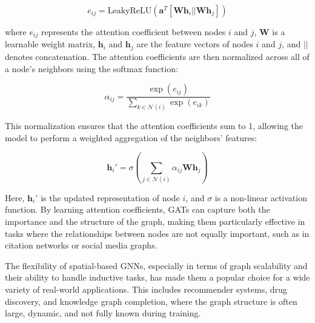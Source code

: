 \[
e_{ij} = \text{LeakyReLU}(\mathbf{a}^T [\mathbf{W} \mathbf{h}_i || \mathbf{W} \mathbf{h}_j])
\]

where $e_{ij}$ represents the attention coefficient between nodes $i$ and $j$, $\mathbf{W}$ is a learnable weight matrix, $\mathbf{h}_i$ and $\mathbf{h}_j$ are the feature vectors of nodes $i$ and $j$, and $||$ denotes concatenation. The attention coefficients are then normalized across all of a node’s neighbors using the softmax function:

\[
\alpha_{ij} = \frac{\exp(e_{ij})}{\sum_{k \in \mathcal{N}(i)} \exp(e_{ik})}
\]

This normalization ensures that the attention coefficients sum to 1, allowing the model to perform a weighted aggregation of the neighbors’ features:

\[
\mathbf{h}_i' = \sigma \left( \sum_{j \in \mathcal{N}(i)} \alpha_{ij} \mathbf{W} \mathbf{h}_j \right)
\]

Here, $\mathbf{h}_i'$ is the updated representation of node $i$, and $\sigma$ is a non-linear activation function. By learning attention coefficients, GATs can capture both the importance and the structure of the graph, making them particularly effective in tasks where the relationships between nodes are not equally important, such as in citation networks or social media graphs.

The flexibility of spatial-based GNNs, especially in terms of graph scalability and their ability to handle inductive tasks, has made them a popular choice for a wide variety of real-world applications. This includes recommender systems, drug discovery, and knowledge graph completion, where the graph structure is often large, dynamic, and not fully known during training.
